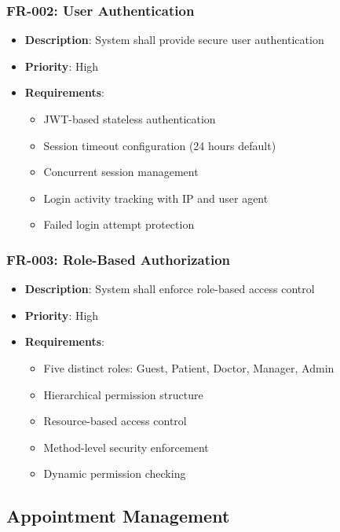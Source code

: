 \documentclass[12pt,a4paper]{article}
\begin{document}
\subsubsection{FR-002: User Authentication}
\begin{itemize}
    \item \textbf{Description}: System shall provide secure user authentication
    \item \textbf{Priority}: High
    \item \textbf{Requirements}:
    \begin{itemize}
        \item JWT-based stateless authentication
        \item Session timeout configuration (24 hours default)
        \item Concurrent session management
        \item Login activity tracking with IP and user agent
        \item Failed login attempt protection
    \end{itemize}
\end{itemize}

\subsubsection{FR-003: Role-Based Authorization}
\begin{itemize}
    \item \textbf{Description}: System shall enforce role-based access control
    \item \textbf{Priority}: High
    \item \textbf{Requirements}:
    \begin{itemize}
        \item Five distinct roles: Guest, Patient, Doctor, Manager, Admin
        \item Hierarchical permission structure
        \item Resource-based access control
        \item Method-level security enforcement
        \item Dynamic permission checking
    \end{itemize}
\end{itemize}

\subsection{Appointment Management}
\end{document}
